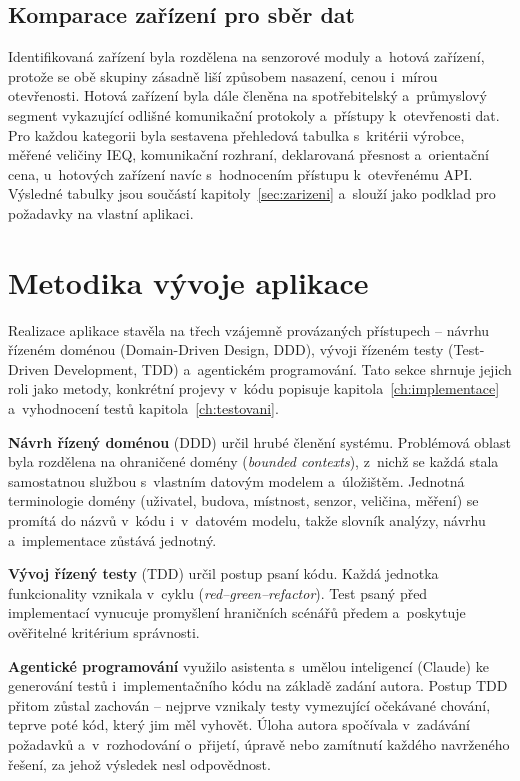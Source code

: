 \FloatBarrier
\subsection{Komparace zařízení pro sběr dat}

Identifikovaná zařízení byla rozdělena na senzorové moduly a~hotová zařízení, protože se obě skupiny zásadně liší způsobem nasazení, cenou i~mírou otevřenosti. Hotová zařízení byla dále členěna na spotřebitelský a~průmyslový segment vykazující odlišné komunikační protokoly a~přístupy k~otevřenosti dat. Pro každou kategorii byla sestavena přehledová tabulka s~kritérii výrobce, měřené veličiny IEQ, komunikační rozhraní, deklarovaná přesnost a~orientační cena, u~hotových zařízení navíc s~hodnocením přístupu k~otevřenému API. Výsledné tabulky jsou součástí kapitoly~\ref{sec:zarizeni} a~slouží jako podklad pro požadavky na vlastní aplikaci.

\FloatBarrier
\section{Metodika vývoje aplikace}
\label{sec:metodika-vyvoje}

Realizace aplikace stavěla na třech vzájemně provázaných přístupech -- návrhu řízeném doménou (Domain-Driven Design, DDD), vývoji řízeném testy (Test-Driven Development, TDD) a~agentickém programování. Tato sekce shrnuje jejich roli jako metody, konkrétní projevy v~kódu popisuje kapitola~\ref{ch:implementace} a~vyhodnocení testů kapitola~\ref{ch:testovani}.

\textbf{Návrh řízený doménou} (DDD) určil hrubé členění systému. Problémová oblast byla rozdělena na ohraničené domény (\emph{bounded contexts}), z~nichž se každá stala samostatnou službou s~vlastním datovým modelem a~úložištěm. Jednotná terminologie domény (uživatel, budova, místnost, senzor, veličina, měření) se promítá do názvů v~kódu i~v~datovém modelu, takže slovník analýzy, návrhu a~implementace zůstává jednotný.

\textbf{Vývoj řízený testy} (TDD) určil postup psaní kódu. Každá jednotka funkcionality vznikala v~cyklu  (\emph{red--green--refactor}). Test psaný před implementací vynucuje promyšlení hraničních scénářů předem a~poskytuje ověřitelné kritérium správnosti.

\textbf{Agentické programování} využilo asistenta s~umělou inteligencí (Claude) ke generování testů i~implementačního kódu na základě zadání autora. Postup TDD přitom zůstal zachován -- nejprve vznikaly testy vymezující očekávané chování, teprve poté kód, který jim měl vyhovět. Úloha autora spočívala v~zadávání požadavků a~v~rozhodování o~přijetí, úpravě nebo zamítnutí každého navrženého řešení, za jehož výsledek nesl odpovědnost.
